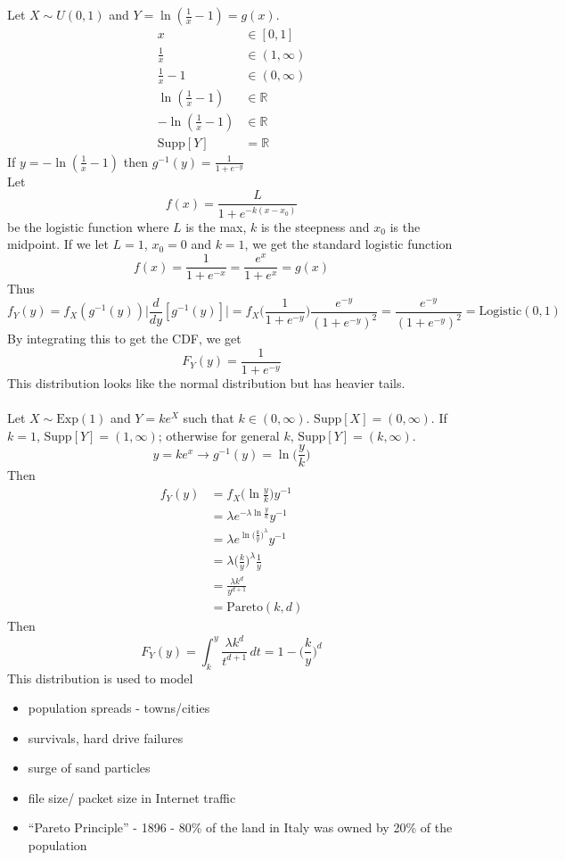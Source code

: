 \documentclass[12pt]{article}
\newcommand{\supp}[1]{\text{Supp}[ #1 ]}
\newcommand{\ginvy}{g^{-1}(y)}
\begin{document}
Let $X \sim U(0, 1)$ and $Y = \ln( \frac{1}{x} - 1) = g(x)$. $$ \begin{aligned} x &\in [0, 1] \\ \frac{1}{x} &\in (1, \infty) \\ \frac{1}{x} - 1 &\in (0, \infty) \\ \ln( \frac{1}{x} - 1) &\in \mathbb{R} \\ -\ln(\frac{1}{x} - 1) &\in \mathbb{R} \\ \supp{Y} &= \mathbb{R} \end{aligned} $$ If $y = -\ln( \frac{1}{x} - 1)$ then $\ginvy = \frac{1}{1 + e^{-y}}$ \\
Let $$f(x) = \frac{L}{1 + e^{-k(x - x_0)}}$$ be the logistic function where $L$ is the max, $k$ is the steepness and $x_0$ is the midpoint. If we let $L = 1$, $x_0 = 0$ and $k = 1$, we get the standard logistic function $$ f(x) = \frac{1}{1 + e^{-x}} = \frac{e^x}{1 + e^x} = g(x) $$ Thus 
$$f_Y(y) = f_X(\ginvy) \Big| \frac{d}{dy} [\ginvy] \Big| = f_X\Big( \frac{1}{1 + e^{-y}}\Big) \frac{e^{-y}}{(1 + e^{-y})^2} = \frac{e^{-y}}{(1 + e^{-y})^2} = \text{Logistic}(0, 1)$$ By integrating this to get the CDF, we get $$F_Y(y) = \frac{1}{1 + e^{-y}} $$ This distribution looks like the normal distribution but has heavier tails. \\~\\
Let $X \sim \text{Exp}(1)$ and $Y = ke^X$ such that $k \in (0, \infty)$. $\supp{X} = (0, \infty)$. If $k = 1$, $\supp{Y} = (1, \infty)$; otherwise for general $k$, $\supp{Y} = (k, \infty)$. 
$$y = ke^x \to \ginvy = \ln \Big(\frac{y}{k}\Big) $$ Then 
$$ \begin{aligned} f_Y(y) &= f_X\Big( \ln \frac{y}{k} \Big) y^{-1} \\ &= \lambda e^{-\lambda \ln \frac{y}{k}}y^{-1} \\ &= \lambda e^{\ln \Big( \frac{k}{y}\Big)^\lambda}y^{-1} \\ &= \lambda \Big( \frac{k}{y} \Big)^\lambda \frac{1}{y} \\ &= \frac{\lambda k^d}{y^{d + 1}} \\ &= \text{Pareto}(k, d)\end{aligned} $$ Then 
$$F_Y(y) = \int_k^y \frac{\lambda k^d}{t^{d + 1}} \, dt = 1 - \Big( \frac{k}{y}\Big)^d $$ This distribution is used to model \begin{itemize} 
\item population spreads - towns/cities 
\item survivals, hard drive failures
\item surge of sand particles 
\item file size/ packet size in Internet traffic 
\item ``Pareto Principle'' -  1896 - 80\% of the land in Italy was owned by 20\% of the population \end{itemize} 
\end{document}
